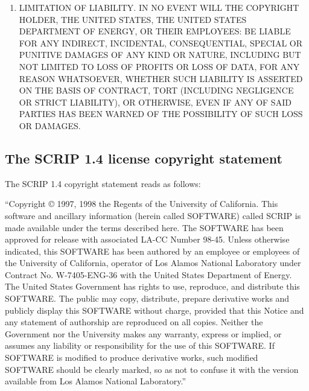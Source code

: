 \begin{enumerate}
\item LIMITATION OF LIABILITY. IN NO EVENT WILL THE COPYRIGHT HOLDER, THE UNITED STATES, THE UNITED STATES DEPARTMENT OF ENERGY, OR THEIR EMPLOYEES: BE LIABLE FOR ANY INDIRECT, INCIDENTAL, CONSEQUENTIAL, SPECIAL OR PUNITIVE DAMAGES OF ANY KIND OR NATURE, INCLUDING BUT NOT LIMITED TO LOSS OF PROFITS OR LOSS OF DATA, FOR ANY REASON WHATSOEVER, WHETHER SUCH LIABILITY IS ASSERTED ON THE BASIS OF CONTRACT, TORT (INCLUDING NEGLIGENCE OR STRICT LIABILITY), OR OTHERWISE, EVEN IF ANY OF SAID PARTIES HAS BEEN WARNED OF THE POSSIBILITY OF SUCH LOSS OR DAMAGES.

\end{enumerate}

\subsection{The SCRIP 1.4 license copyright statement}
\label{sec_SCRIP}

The SCRIP 1.4 copyright statement reads as follows:

``Copyright © 1997, 1998 the Regents of the University of California.
This software and ancillary information (herein called SOFTWARE)
called SCRIP is made available under the terms described here. The
SOFTWARE has been approved for release with associated LA-CC Number
98-45. Unless otherwise indicated, this SOFTWARE has been authored by
an employee or employees of the University of California, operator of
Los Alamos National Laboratory under Contract No. W-7405-ENG-36 with
the United States Department of Energy. The United States Government
has rights to use, reproduce, and distribute this SOFTWARE. The public
may copy, distribute, prepare derivative works and publicly display
this SOFTWARE without charge, provided that this Notice and any
statement of authorship are reproduced on all copies. Neither the
Government nor the University makes any warranty, express or implied,
or assumes any liability or responsibility for the use of this
SOFTWARE. If SOFTWARE is modified to produce derivative works, such
modified SOFTWARE should be clearly marked, so as not to confuse it
with the version available from Los Alamos National Laboratory.''
